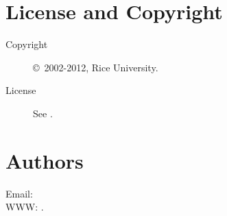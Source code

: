 \documentclass[english]{article}
\begin{document}
\section{License and Copyright}

\begin{description}
\item[Copyright] \copyright\ 2002-2012, Rice University.
\item[License] See .
\end{description}

\section{Authors}

Email:  \\
WWW: .

\LatexManEnd
\end{document}
